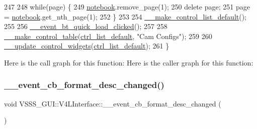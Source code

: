 \begin{DoxyCode}
247 
248         \textcolor{keywordflow}{while}(page) \{
249             \hyperlink{class_v_s_s_s___g_u_i_1_1_v4_l_interface_a658017c295c18a779272aa6182664da5}{notebook}.remove\_page(1);
250             \textcolor{keyword}{delete} page;
251             page = \hyperlink{class_v_s_s_s___g_u_i_1_1_v4_l_interface_a658017c295c18a779272aa6182664da5}{notebook}.get\_nth\_page(1);
252         \}
253 
254         \hyperlink{class_v_s_s_s___g_u_i_1_1_v4_l_interface_af0b71067889b902882e4f181b0a04aed}{\_\_make\_control\_list\_default}();
255 
256         \hyperlink{class_v_s_s_s___g_u_i_1_1_v4_l_interface_a3010084dff2d7f93eed40efaab8ee61b}{\_\_event\_bt\_quick\_load\_clicked}();
257 
258         \hyperlink{class_v_s_s_s___g_u_i_1_1_v4_l_interface_a4f70f4aaf3b7520d2f28ca06e3e94bd4}{\_\_make\_control\_table}(\hyperlink{class_v_s_s_s___g_u_i_1_1_v4_l_interface_a97faf21f7b67c8ef15ceeafa377c6ea4}{ctrl\_list\_default}, \textcolor{stringliteral}{"Cam Configs"});
259 
260         \hyperlink{class_v_s_s_s___g_u_i_1_1_v4_l_interface_afbb5daccfdce20180578025c108ef65b}{\_\_update\_control\_widgets}(\hyperlink{class_v_s_s_s___g_u_i_1_1_v4_l_interface_a97faf21f7b67c8ef15ceeafa377c6ea4}{ctrl\_list\_default});
261     \}
\end{DoxyCode}
Here is the call graph for this function\+:
Here is the caller graph for this function\+:
\mbox{\label{class_v_s_s_s___g_u_i_1_1_v4_l_interface_a41dc791b309dcb6e4469c6cc9d4a4852}} 
\subsubsection{\texorpdfstring{\+\_\+\+\_\+event\+\_\+cb\+\_\+format\+\_\+desc\+\_\+changed()}{\_\_event\_cb\_format\_desc\_changed()}}
{\footnotesize\ttfamily void V\+S\+S\+S\+\_\+\+G\+U\+I\+::\+V4\+L\+Interface\+::\+\_\+\+\_\+event\+\_\+cb\+\_\+format\+\_\+desc\+\_\+changed (\begin{DoxyParamCaption}{ }\end{DoxyParamCaption})}



